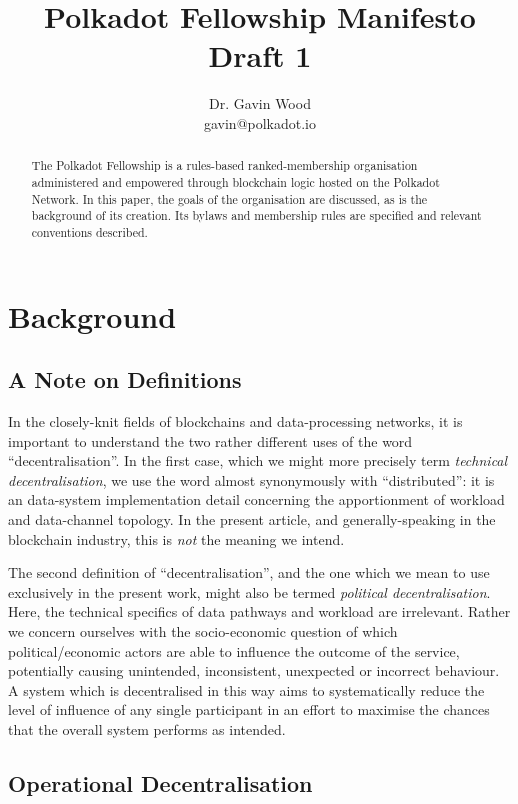 \documentclass[9pt,oneside]{amsart}
\title{Polkadot Fellowship Manifesto \\ {\smaller \textbf{Draft 1}}}
\author{ Dr. Gavin Wood\\ gavin@polkadot.io}
\begin{document}
\begin{abstract}

The Polkadot Fellowship is a rules-based ranked-membership organisation administered and empowered
through blockchain logic hosted on the Polkadot Network. In this paper, the goals of the organisation are discussed, as is the background of its creation. Its bylaws and membership rules are specified and relevant conventions described.

\end{abstract}

\maketitle

\section{Background}\label{background}

\subsection{A Note on Definitions}

In the closely-knit fields of blockchains and data-processing networks, it is important to understand the two rather different uses of the word ``decentralisation''. In the first case, which we might more precisely term \emph{technical decentralisation}, we use the word almost synonymously with ``distributed'': it is an data-system implementation detail concerning the apportionment of workload and data-channel topology. In the present article, and generally-speaking in the blockchain industry, this is \emph{not} the meaning we intend.

The second definition of ``decentralisation'', and the one which we mean to use exclusively in the present work, might also be termed \emph{political decentralisation}. Here, the technical specifics of data pathways and workload are irrelevant. Rather we concern ourselves with the socio-economic question of which political/economic actors are able to influence the outcome of the service, potentially causing unintended, inconsistent, unexpected or incorrect behaviour. A system which is decentralised in this way aims to systematically reduce the level of influence of any single participant in an effort to maximise the chances that the overall system performs as intended.

\subsection{Operational Decentralisation}
\end{document}
